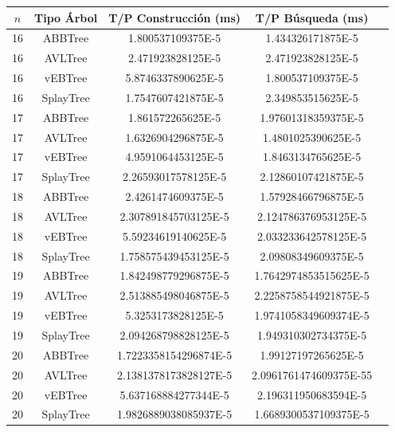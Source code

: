 \documentclass[letterpaper,12pt]{article}
\begin{document}
\begin{tabular}{|c|c|c|c|c|}
\hline
\textbf{$n$} & \textbf{Tipo Árbol} & \textbf{T/P Construcción (ms)} & \textbf{T/P Búsqueda (ms)} \\
\hline
16 & ABBTree & 1.800537109375E-5 & 1.434326171875E-5 \\
\hline
16 & AVLTree & 2.471923828125E-5  & 2.471923828125E-5 \\
\hline
16 & vEBTree & 5.8746337890625E-5  & 1.800537109375E-5 \\
\hline
16 & SplayTree & 1.7547607421875E-5 & 2.349853515625E-5 \\
\hline
\hline
17 & ABBTree & 1.861572265625E-5  & 1.97601318359375E-5 \\
\hline
17 & AVLTree & 1.6326904296875E-5 & 1.4801025390625E-5 \\
\hline
17 & vEBTree & 4.9591064453125E-5  & 1.8463134765625E-5\\
\hline
17 & SplayTree & 2.26593017578125E-5 & 2.12860107421875E-5 \\
\hline
\hline
18 & ABBTree & 2.4261474609375E-5 & 1.57928466796875E-5 \\
\hline
18 & AVLTree & 2.307891845703125E-5 & 2.124786376953125E-5 \\
\hline
18 & vEBTree & 5.59234619140625E-5 & 2.033233642578125E-5 \\
\hline
18 & SplayTree & 1.758575439453125E-5  & 2.09808349609375E-5 \\
\hline
\hline
19 & ABBTree & 1.842498779296875E-5 & 1.7642974853515625E-5 \\
\hline
19 & AVLTree & 2.513885498046875E-5  & 2.2258758544921875E-5 \\
\hline
19 & vEBTree & 5.3253173828125E-5 & 1.9741058349609374E-5\\
\hline
19 & SplayTree & 2.094268798828125E-5 & 1.949310302734375E-5 \\
\hline
\hline
20 & ABBTree & 1.7223358154296874E-5 & 1.99127197265625E-5 \\
\hline
20 & AVLTree & 2.1381378173828127E-5 & 2.0961761474609375E-55 \\
\hline
20 & vEBTree & 5.637168884277344E-5 & 2.196311950683594E-5\\
\hline
20 & SplayTree & 1.9826889038085937E-5 & 1.6689300537109375E-5 \\
\hline
\end{tabular}
\\ \\
\end{document}
